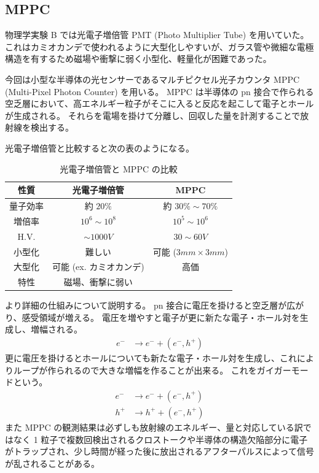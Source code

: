 \documentclass[uplatex,dvipdfmx,a4paper,11pt]{jlreq}
\numberwithin{equation}{section}
\theoremstyle{definition}
\begin{document}
\subsection{MPPC}
物理学実験 B では光電子増倍管 PMT (Photo Multiplier Tube) を用いていた。これはカミオカンデで使われるように大型化しやすいが、ガラス管や微細な電極構造を有するため磁場や衝撃に弱く小型化、軽量化が困難であった。

今回は小型な半導体の光センサーであるマルチピクセル光子カウンタ MPPC (Multi-Pixel Photon Counter) を用いる。
MPPC は半導体の pn 接合で作られる空乏層において、高エネルギー粒子がそこに入ると反応を起こして電子とホールが生成される。
それらを電場を掛けて分離し、回収した量を計測することで放射線を検出する。

光電子増倍管と比較すると次の表のようになる。
\begin{table}
  \centering
  \begin{tabular}{|c|cc|}
    \hline
    性質   & 光電子増倍管             & MPPC                           \\
    \hline \hline
    量子効率 & 約 $20\%$           & 約 $30\%\sim 70\%$              \\
    増倍率  & $10^6\sim 10^8$    & $10^5\sim 10^6$                \\
    H.V. & $\sim 1000 \si{V}$ & $30\sim 60\si{V}$              \\
    小型化  & 難しい                & 可能 ($3\si{mm}\times 3\si{mm}$) \\
    大型化  & 可能 (ex. カミオカンデ)    & 高価                             \\
    特性   & 磁場、衝撃に弱い           &                                \\
    \hline
  \end{tabular}
  \caption{光電子増倍管と MPPC の比較}
  \label{table:PMT MPPC}
\end{table}

より詳細の仕組みについて説明する。
pn 接合に電圧を掛けると空乏層が広がり、感受領域が増える。
電圧を増やすと電子が更に新たな電子・ホール対を生成し、増幅される。
\begin{align}
  e^- & \to e^- + (e^-, h^+)
\end{align}
更に電圧を掛けるとホールについても新たな電子・ホール対を生成し、これによりループが作られるので大きな増幅を作ることが出来る。
これをガイガーモードという。
\begin{align}
  e^- & \to e^- + (e^-, h^+) \\
  h^+ & \to h^+ + (e^-, h^+)
\end{align}
また MPPC の観測結果は必ずしも放射線のエネルギー、量と対応している訳ではなく 1 粒子で複数回検出されるクロストークや半導体の構造欠陥部分に電子がトラップされ、少し時間が経った後に放出されるアフターパルスによって信号が乱されることがある。
\end{document}
